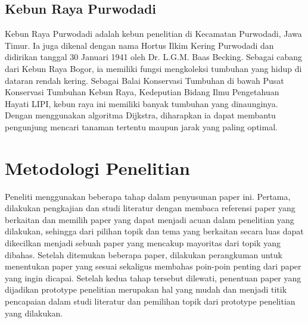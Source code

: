 \documentclass[conference]{IEEEtran}
\begin{document}
\subsection{Kebun Raya Purwodadi}
Kebun Raya Purwodadi adalah kebun penelitian di Kecamatan Purwodadi, Jawa Timur.
Ia juga dikenal dengan nama Hortus Ilkim Kering Purwodadi dan didirikan tanggal 30 Januari 1941 oleh Dr. L.G.M. Baas Becking.
Sebagai cabang dari Kebun Raya Bogor, ia memiliki fungsi mengkoleksi tumbuhan yang hidup di dataran rendah kering.
Sebagai Balai Konservasi Tumbuhan di bawah Pusat Konservasi Tumbuhan Kebun Raya, Kedeputian Bidang Ilmu Pengetahuan Hayati LIPI, kebun raya ini memiliki banyak tumbuhan yang dinaunginya.
Dengan menggunakan algoritma Dijkstra, diharapkan ia dapat membantu pengunjung mencari tanaman tertentu maupun jarak yang paling optimal. 


\section{Metodologi Penelitian}
Peneliti menggunakan beberapa tahap dalam penyusunan paper ini.
Pertama, dilakukan pengkajian dan studi literatur dengan membaca referensi paper yang berkaitan dan memilih paper yang dapat menjadi acuan dalam penelitian yang dilakukan, sehingga dari pilihan topik dan tema yang berkaitan secara luas dapat dikecilkan menjadi sebuah paper yang mencakup mayoritas dari topik yang dibahas.
Setelah ditemukan beberapa paper, dilakukan perangkuman untuk menentukan paper yang sesuai sekaligus membahas poin-poin penting dari paper yang ingin dicapai.
Setelah kedua tahap tersebut dilewati, penentuan paper yang dijadikan prototype penelitian merupakan hal yang mudah dan menjadi titik pencapaian dalam studi literatur dan pemilihan topik dari prototype penelitian yang dilakukan.
\end{document}
